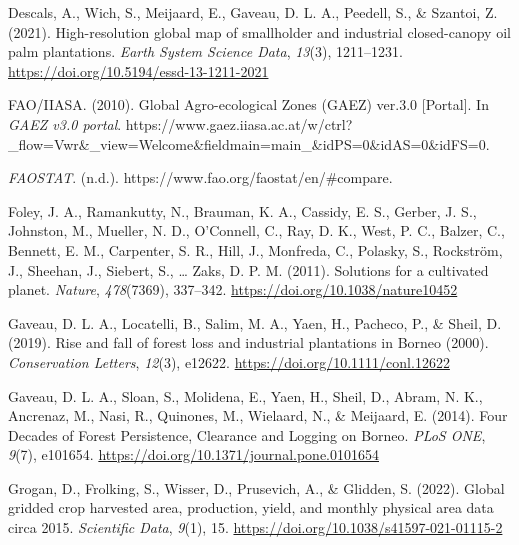 \documentclass[
  letterpaper,
  DIV=11,
  numbers=noendperiod]{scrreprt}
\newlength{\cslhangindent}
\newlength{\cslentryspacingunit} %
\newenvironment{CSLReferences}[2] %
 {%
  \setlength{\parindent}{0pt}
  \ifodd #1
  \let\oldpar\par
  \def\par{\hangindent=\cslhangindent\oldpar}
  \fi
  \setlength{\parskip}{#2\cslentryspacingunit}
 }%
 {}
\begin{document}
\begin{CSLReferences}{1}{0}
\leavevmode{}%
Descals, A., Wich, S., Meijaard, E., Gaveau, D. L. A., Peedell, S., \&
Szantoi, Z. (2021). High-resolution global map of smallholder and
industrial closed-canopy oil palm plantations. \emph{Earth System
Science Data}, \emph{13}(3), 1211--1231.
\url{https://doi.org/10.5194/essd-13-1211-2021}

\leavevmode{}%
FAO/IIASA. (2010). Global {Agro-ecological Zones} ({GAEZ}) ver.3.0
{[}Portal{]}. In \emph{GAEZ v3.0 portal}.
https://www.gaez.iiasa.ac.at/w/ctrl?\_flow=Vwr\&\_view=Welcome\&fieldmain=main\_\&idPS=0\&idAS=0\&idFS=0.

\leavevmode{}%
\emph{{FAOSTAT}}. (n.d.). https://www.fao.org/faostat/en/\#compare.

\leavevmode{}%
Foley, J. A., Ramankutty, N., Brauman, K. A., Cassidy, E. S., Gerber, J.
S., Johnston, M., Mueller, N. D., O'Connell, C., Ray, D. K., West, P.
C., Balzer, C., Bennett, E. M., Carpenter, S. R., Hill, J., Monfreda,
C., Polasky, S., Rockström, J., Sheehan, J., Siebert, S., \ldots{} Zaks,
D. P. M. (2011). Solutions for a cultivated planet. \emph{Nature},
\emph{478}(7369), 337--342. \url{https://doi.org/10.1038/nature10452}

\leavevmode{}%
Gaveau, D. L. A., Locatelli, B., Salim, M. A., Yaen, H., Pacheco, P., \&
Sheil, D. (2019). Rise and fall of forest loss and industrial
plantations in {Borneo} (2000). \emph{Conservation
Letters}, \emph{12}(3), e12622. \url{https://doi.org/10.1111/conl.12622}

\leavevmode{}%
Gaveau, D. L. A., Sloan, S., Molidena, E., Yaen, H., Sheil, D., Abram,
N. K., Ancrenaz, M., Nasi, R., Quinones, M., Wielaard, N., \& Meijaard,
E. (2014). Four {Decades} of {Forest Persistence}, {Clearance} and
{Logging} on {Borneo}. \emph{PLoS ONE}, \emph{9}(7), e101654.
\url{https://doi.org/10.1371/journal.pone.0101654}

\leavevmode{}%
Grogan, D., Frolking, S., Wisser, D., Prusevich, A., \& Glidden, S.
(2022). Global gridded crop harvested area, production, yield, and
monthly physical area data circa 2015. \emph{Scientific Data},
\emph{9}(1), 15. \url{https://doi.org/10.1038/s41597-021-01115-2}


\end{CSLReferences}
\end{document}
